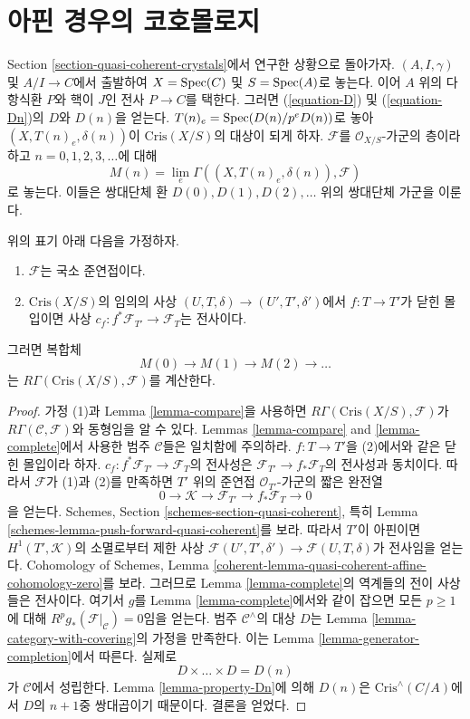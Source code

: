 \section{아핀 경우의 코호몰로지}
\label{section-cohomology-affine}

\noindent
Section \ref{section-quasi-coherent-crystals}에서 연구한 상황으로
돌아가자. $(A, I, \gamma)$ 및 $A/I \to C$에서 출발하여
$X = \mathop{\mathrm{Spec}}(C)$ 및 $S = \mathop{\mathrm{Spec}}(A)$로 놓는다. 이어 $A$ 위의 다항식환
$P$와 핵이 $J$인 전사 $P \to C$를 택한다. 그러면
(\ref{equation-D}) 및 (\ref{equation-Dn})의 $D$와 $D(n)$을 얻는다.
$T(n)_e = \mathop{\mathrm{Spec}}(D(n)/p^eD(n))$로 놓아
$(X, T(n)_e, \delta(n))$이 $\text{Cris}(X/S)$의 대상이 되게 하자.
$\mathcal{F}$를 $\mathcal{O}_{X/S}$-가군의 층이라 하고
$n = 0, 1, 2, 3, \ldots$에 대해
$$
M(n) = \lim_e \Gamma((X, T(n)_e, \delta(n)), \mathcal{F})
$$
로 놓는다. 이들은 쌍대단체 환 $D(0), D(1), D(2), \ldots$ 위의
쌍대단체 가군을 이룬다.

\begin{proposition}
\label{proposition-compute-cohomology}
위의 표기 아래 다음을 가정하자.
\begin{enumerate}
\item $\mathcal{F}$는 국소 준연접이다.
\item $\text{Cris}(X/S)$의 임의의 사상
$(U, T, \delta) \to (U', T', \delta')$에서
$f : T \to T'$가 닫힌 몰입이면 사상
$c_f : f^*\mathcal{F}_{T'} \to \mathcal{F}_T$는 전사이다.
\end{enumerate}
그러면 복합체
$$
M(0) \to M(1) \to M(2) \to \ldots
$$
는 $R\Gamma(\text{Cris}(X/S), \mathcal{F})$를 계산한다.
\end{proposition}

\begin{proof}
가정 (1)과 Lemma \ref{lemma-compare}을 사용하면
$R\Gamma(\text{Cris}(X/S), \mathcal{F})$가
$R\Gamma(\mathcal{C}, \mathcal{F})$와 동형임을 알 수 있다.
Lemmas \ref{lemma-compare} and \ref{lemma-complete}에서 사용한 범주
$\mathcal{C}$들은 일치함에 주의하라. $f : T \to T'$을 (2)에서와
같은 닫힌 몰입이라 하자. $c_f : f^*\mathcal{F}_{T'} \to
\mathcal{F}_T$의 전사성은 $\mathcal{F}_{T'} \to
f_*\mathcal{F}_T$의 전사성과 동치이다. 따라서 $\mathcal{F}$가
(1)과 (2)를 만족하면 $T'$ 위의 준연접 $\mathcal{O}_{T'}$-가군의
짧은 완전열
$$
0 \to \mathcal{K} \to \mathcal{F}_{T'} \to f_*\mathcal{F}_T \to 0
$$
을 얻는다. Schemes, Section \ref{schemes-section-quasi-coherent}, 특히
Lemma \ref{schemes-lemma-push-forward-quasi-coherent}를 보라.
따라서 $T'$이 아핀이면 $H^1(T', \mathcal{K})$의 소멸로부터 제한 사상
$\mathcal{F}(U', T', \delta') \to \mathcal{F}(U, T, \delta)$가
전사임을 얻는다. Cohomology of Schemes, Lemma
\ref{coherent-lemma-quasi-coherent-affine-cohomology-zero}를 보라.
그러므로 Lemma \ref{lemma-complete}의 역계들의 전이 사상들은
전사이다. 여기서 $g$를 Lemma \ref{lemma-complete}에서와 같이 잡으면
모든 $p \geq 1$에 대해
$R^pg_*(\mathcal{F}|_\mathcal{C}) = 0$임을 얻는다.
범주 $\mathcal{C}^\wedge$의 대상 $D$는 Lemma
\ref{lemma-category-with-covering}의 가정을 만족한다. 이는 Lemma
\ref{lemma-generator-completion}에서 따른다. 실제로
$$
D \times \ldots \times D = D(n)
$$
가 $\mathcal{C}$에서 성립한다. Lemma \ref{lemma-property-Dn}에 의해
$D(n)$은 $\text{Cris}^\wedge(C/A)$에서 $D$의 $n + 1$중
쌍대곱이기 때문이다. 결론을 얻었다.
\end{proof}

